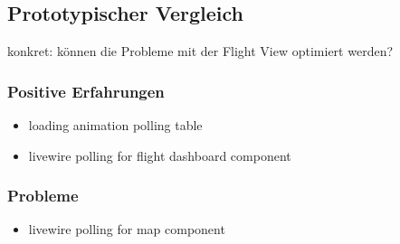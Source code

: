 \subsection{Prototypischer Vergleich}
konkret: können die Probleme mit der Flight View optimiert werden?

\subsubsection{Positive Erfahrungen}
\begin{itemize}
    \item loading animation polling table
    \item livewire polling for flight dashboard component
\end{itemize}

\subsubsection{Probleme}
\begin{itemize}
    \item livewire polling for map component
\end{itemize}
